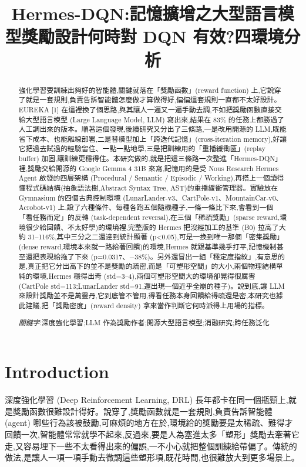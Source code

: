 \documentclass[conference,onecolumn,letterpaper,10pt]{IEEEtran}
\title{Hermes-DQN:記憶擴增之大型語言模型獎勵設計何時對 DQN 有效?四環境分析}
\author{\IEEEauthorblockN{陳盛茂、林仙安、辛語柔、陳冠宇}
\IEEEauthorblockA{國立中興大學　資訊管理學研究所}}
\begin{document}
\maketitle
\thispagestyle{plain}

\begin{abstract}
強化學習要訓練出夠好的智能體,關鍵就落在「獎勵函數」(reward function) 上,它說穿了就是一套規則,負責告訴智能體怎麼做才算做得好,偏偏這套規則一直都不太好設計。EUREKA {[}1{]} 在這裡換了個思路,與其讓人一遍又一遍手動去調,不如把獎勵函數直接交給大型語言模型 (Large Language Model, LLM) 寫出來,結果在 83\% 的任務上都勝過了人工調出來的版本。順著這個發現,後續研究又分出了三條路,一是改用開源的 LLM,既能省下成本、也能離線部署,二是替模型加上「跨迭代記憶」(cross-iteration memory),好讓它把過去試過的經驗留住、一點一點地學,三是把訓練用的「重播緩衝區」(replay buffer) 加固,讓訓練更穩得住。本研究做的,就是把這三條路一次整進「Hermes-DQN」裡,獎勵交給開源的 Google Gemma 4 31B 來寫,記憶用的是受 Nous Research Hermes Agent 啟發的四層架構 (Procedural / Semantic / Episodic / Working),再搭上一個讀得懂程式碼結構(抽象語法樹,Abstract Syntax Tree, AST)的重播緩衝管理器。實驗放在 Gymnasium 的四個古典控制環境 (LunarLander-v3、CartPole-v1、MountainCar-v0、Acrobot-v1) 上,設了六種條件、每種各跑五個隨機種子,一條一條比下來,會看到一個「看任務而定」的反轉 (task-dependent reversal),在三個「稀疏獎勵」(sparse reward,環境很少給回饋、不太好學)的環境裡,完整版的 Hermes 把沒經加工的基準 (B0) 拉高了大約 31--116\%,其中三分之二還達到統計顯著 (p\textless0.05),可是一換到唯一那個「密集獎勵」(dense reward,環境本來就一路給著回饋)的環境,Hermes 就跟基準幾乎打平,記憶機制甚至還把表現給拖了下來 (p=0.0317、−38\%)。另外還冒出一組「穩定度指紋」,有意思的是,真正把它分出高下的並不是獎勵的疏密,而是「可塑形空間」的大小,兩個物理結構單純的環境,Hermes 穩得出奇 (std=3--4),兩個可塑形空間大的環境卻晃得很厲害 (CartPole std=113;LunarLander std=91,還出現一個近乎全崩的種子)。說到底,讓 LLM 來設計獎勵並不是萬靈丹,它到底管不管用,得看任務本身回饋給得疏還是密,本研究也據此建議,把「獎勵密度」(reward density) 拿來當作判斷它何時派得上用場的指標。

\emph{關鍵字}:深度強化學習;LLM 作為獎勵作者;開源大型語言模型;消融研究;跨任務泛化
\end{abstract}

\section{Introduction}

深度強化學習 (Deep Reinforcement Learning, DRL) 長年都卡在同一個瓶頸上,就是獎勵函數很難設計得好。說穿了,獎勵函數就是一套規則,負責告訴智能體 (agent) 哪些行為該被鼓勵,可麻煩的地方在於,環境給的獎勵要是太稀疏、難得才回饋一次,智能體常常就學不起來,反過來,要是人為塞進太多「塑形」獎勵去牽著它走,又容易埋下一些不太看得出來的偏誤,一不小心就把整個訓練給帶偏了。傳統的做法,是讓人一項一項手動去微調這些塑形項,既花時間,也很難放大到更多場景上。
\end{document}
